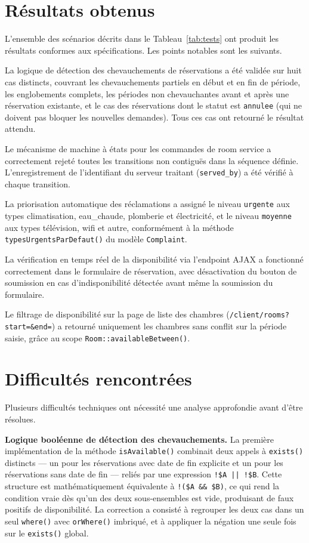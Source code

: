 \documentclass[12pt,a4paper]{report}
\begin{document}
\section{Résultats obtenus}

L'ensemble des scénarios décrits dans le Tableau~\ref{tab:tests} ont
produit les résultats conformes aux spécifications. Les points notables
sont les suivants.

La logique de détection des chevauchements de réservations a été validée
sur huit cas distincts, couvrant les chevauchements partiels en début et
en fin de période, les englobements complets, les périodes non chevauchantes
avant et après une réservation existante, et le cas des réservations dont
le statut est \texttt{annulee} (qui ne doivent pas bloquer les nouvelles
demandes). Tous ces cas ont retourné le résultat attendu.

Le mécanisme de machine à états pour les commandes de room service a
correctement rejeté toutes les transitions non contiguës dans la séquence
définie. L'enregistrement de l'identifiant du serveur traitant (\texttt{served\_by})
a été vérifié à chaque transition.

La priorisation automatique des réclamations a assigné le niveau
\texttt{urgente} aux types climatisation, eau\_chaude, plomberie et
électricité, et le niveau \texttt{moyenne} aux types télévision, wifi et
autre, conformément à la méthode \texttt{typesUrgentsParDefaut()} du
modèle \texttt{Complaint}.

La vérification en temps réel de la disponibilité via l'endpoint AJAX a
fonctionné correctement dans le formulaire de réservation, avec désactivation
du bouton de soumission en cas d'indisponibilité détectée avant même la
soumission du formulaire.

Le filtrage de disponibilité sur la page de liste des chambres
(\texttt{/client/rooms?start=\&end=}) a retourné uniquement les chambres
sans conflit sur la période saisie, grâce au scope
\texttt{Room::availableBetween()}.

\section{Difficultés rencontrées}

Plusieurs difficultés techniques ont nécessité une analyse approfondie avant
d'être résolues.

\textbf{Logique booléenne de détection des chevauchements.} La première
implémentation de la méthode \texttt{isAvailable()} combinait deux appels
à \texttt{exists()} distincts — un pour les réservations avec date de fin
explicite et un pour les réservations sans date de fin — reliés par une
expression \texttt{!\$A || !\$B}. Cette structure est mathématiquement
équivalente à \texttt{!(\$A \&\& \$B)}, ce qui rend la condition vraie dès
qu'un des deux sous-ensembles est vide, produisant de faux positifs de
disponibilité. La correction a consisté à regrouper les deux cas dans un
seul \texttt{where()} avec \texttt{orWhere()} imbriqué, et à appliquer la
négation une seule fois sur le \texttt{exists()} global.
\end{document}
